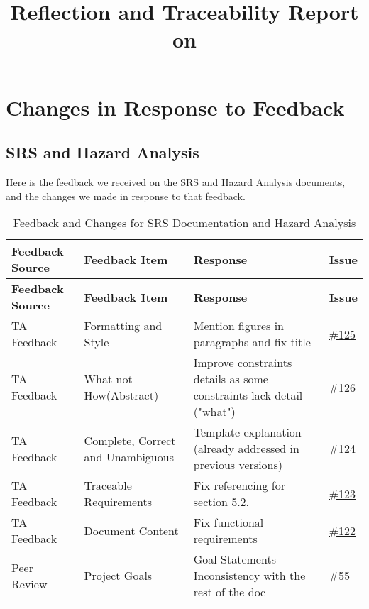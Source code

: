 \documentclass{article}
\title{Reflection and Traceability Report on \progname}
\author{\authname}
\date{}
\begin{document}
\maketitle

\section{Changes in Response to Feedback}

\subsection{SRS and Hazard Analysis}

Here is the feedback we received on the SRS and Hazard Analysis documents, and the changes we made in response to that feedback.

\begin{longtable}{| p{} | p{} | p{} | p{} |}
    \caption{Feedback and Changes for SRS Documentation and Hazard Analysis} \\
    \hline
    \textbf{Feedback Source} & \textbf{Feedback Item} & \textbf{Response} & \textbf{Issue} \\
    \hline
    \endfirsthead
    \hline
    \textbf{Feedback Source} & \textbf{Feedback Item} & \textbf{Response} & \textbf{Issue} \\
    \hline
    \endhead
    \hline
    \endfoot
    TA Feedback & Formatting and Style & Mention figures in paragraphs and fix title & \href{https://github.com/RezaJodeiri/CXR-Capstone/issues/125}{\#125}\\
    \hline
    TA Feedback & What not How(Abstract) & Improve constraints details as some constraints lack detail ("what") & \href{https://github.com/RezaJodeiri/CXR-Capstone/issues/126}{\#126} \\
    \hline
    TA Feedback & Complete, Correct and Unambiguous & Template explanation (already addressed in previous versions) & \href{https://github.com/RezaJodeiri/CXR-Capstone/issues/124}{\#124}\\
    \hline
    TA Feedback & Traceable Requirements & Fix referencing for section 5.2. & \href{https://github.com/RezaJodeiri/CXR-Capstone/issues/123}{\#123} \\
    \hline
    TA Feedback & Document Content & Fix functional requirements & \href{https://github.com/RezaJodeiri/CXR-Capstone/issues/122}{\#122} \\
    \hline
    Peer Review & Project Goals & Goal Statements Inconsistency with the rest of the doc & \href{https://github.com/RezaJodeiri/CXR-Capstone/issues/55}{\#55} \\

\end{longtable}
\end{document}
